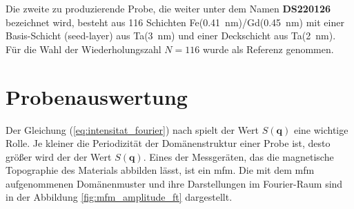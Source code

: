 \noindent
Die zweite zu produzierende Probe, die weiter unter dem Namen \textbf{DS220126} bezeichnet wird, besteht aus 116 Schichten Fe(\SI{0.41}{\nano\meter})/Gd(\SI{0.45}{\nano\meter}) mit einer Basis-Schicht (seed-layer) aus
Ta(\SI{3}{\nano\meter}) und einer Deckschicht aus Ta(\SI{2}{\nano\meter}). Für die Wahl der Wiederholungszahl $N=116$ wurde \cite[Abschnitt „Sample Preparation“]{tripathi_dichroic_2011} als Referenz genommen.

\section{Probenauswertung}
Der Gleichung (\ref{eq:intensitat_fourier}) nach spielt der Wert $S(\mathbf{q})$ eine wichtige Rolle. Je kleiner die Periodizität der Domänenstruktur einer Probe ist, desto größer wird der der Wert $S(\mathbf{q})$. Eines der Messgeräten, das die magnetische Topographie des Materials abbilden lässt, ist ein \gls{mfm}. Die mit dem \gls{mfm} aufgenommenen Domänenmuster und ihre Darstellungen im Fourier-Raum sind in der Abbildung \ref{fig:mfm_amplitude_ft} dargestellt.
